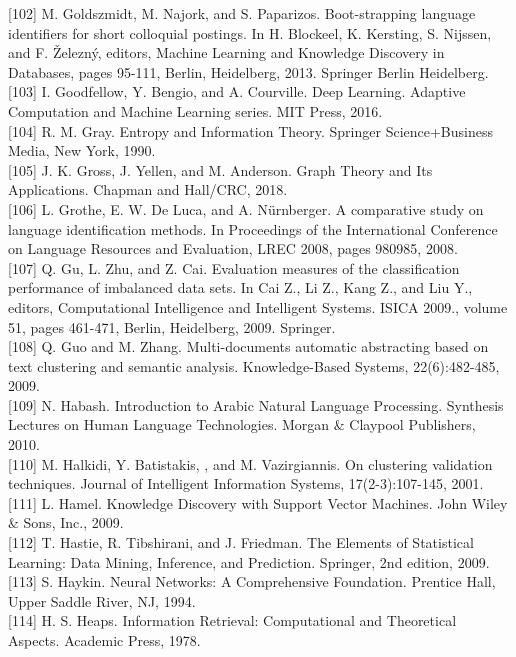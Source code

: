 \documentclass[10pt]{book}
\begin{document}
[102] M. Goldszmidt, M. Najork, and S. Paparizos. Boot-strapping language identifiers for short colloquial postings. In H. Blockeel, K. Kersting, S. Nijssen, and F. Železný, editors, Machine Learning and Knowledge Discovery in Databases, pages 95-111, Berlin, Heidelberg, 2013. Springer Berlin Heidelberg.\\[0pt]
[103] I. Goodfellow, Y. Bengio, and A. Courville. Deep Learning. Adaptive Computation and Machine Learning series. MIT Press, 2016.\\[0pt]
[104] R. M. Gray. Entropy and Information Theory. Springer Science+Business Media, New York, 1990.\\[0pt]
[105] J. K. Gross, J. Yellen, and M. Anderson. Graph Theory and Its Applications. Chapman and Hall/CRC, 2018.\\[0pt]
[106] L. Grothe, E. W. De Luca, and A. Nürnberger. A comparative study on language identification methods. In Proceedings of the International Conference on Language Resources and Evaluation, LREC 2008, pages 980985, 2008.\\[0pt]
[107] Q. Gu, L. Zhu, and Z. Cai. Evaluation measures of the classification performance of imbalanced data sets. In Cai Z., Li Z., Kang Z., and Liu Y., editors, Computational Intelligence and Intelligent Systems. ISICA 2009., volume 51, pages 461-471, Berlin, Heidelberg, 2009. Springer.\\[0pt]
[108] Q. Guo and M. Zhang. Multi-documents automatic abstracting based on text clustering and semantic analysis. Knowledge-Based Systems, 22(6):482-485, 2009.\\[0pt]
[109] N. Habash. Introduction to Arabic Natural Language Processing. Synthesis Lectures on Human Language Technologies. Morgan \& Claypool Publishers, 2010.\\[0pt]
[110] M. Halkidi, Y. Batistakis, , and M. Vazirgiannis. On clustering validation techniques. Journal of Intelligent Information Systems, 17(2-3):107-145, 2001.\\[0pt]
[111] L. Hamel. Knowledge Discovery with Support Vector Machines. John Wiley \& Sons, Inc., 2009.\\[0pt]
[112] T. Hastie, R. Tibshirani, and J. Friedman. The Elements of Statistical Learning: Data Mining, Inference, and Prediction. Springer, 2nd edition, 2009.\\[0pt]
[113] S. Haykin. Neural Networks: A Comprehensive Foundation. Prentice Hall, Upper Saddle River, NJ, 1994.\\[0pt]
[114] H. S. Heaps. Information Retrieval: Computational and Theoretical Aspects. Academic Press, 1978.\\[0pt]
\end{document}

